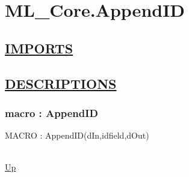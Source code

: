 \chapter*{ML\_Core.AppendID}
\hypertarget{ML_Core.AppendID}{}

\section*{\underline{IMPORTS}}

\section*{\underline{DESCRIPTIONS}}
\subsection*{macro : AppendID}
\hypertarget{ecldoc:ml_core.appendid}{MACRO : AppendID(dIn,idfield,dOut)} \\
\hyperlink{ecldoc:}{Up} \\
\par
